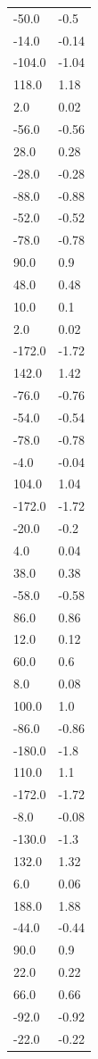 \begin{longtable}{ll}
-50.0 & -0.5 \\
-14.0 & -0.14 \\
-104.0 & -1.04 \\
118.0 & 1.18 \\
2.0 & 0.02 \\
-56.0 & -0.56 \\
28.0 & 0.28 \\
-28.0 & -0.28 \\
-88.0 & -0.88 \\
-52.0 & -0.52 \\
-78.0 & -0.78 \\
90.0 & 0.9 \\
48.0 & 0.48 \\
10.0 & 0.1 \\
2.0 & 0.02 \\
-172.0 & -1.72 \\
142.0 & 1.42 \\
-76.0 & -0.76 \\
-54.0 & -0.54 \\
-78.0 & -0.78 \\
-4.0 & -0.04 \\
104.0 & 1.04 \\
-172.0 & -1.72 \\
-20.0 & -0.2 \\
4.0 & 0.04 \\
38.0 & 0.38 \\
-58.0 & -0.58 \\
86.0 & 0.86 \\
12.0 & 0.12 \\
60.0 & 0.6 \\
8.0 & 0.08 \\
100.0 & 1.0 \\
-86.0 & -0.86 \\
-180.0 & -1.8 \\
110.0 & 1.1 \\
-172.0 & -1.72 \\
-8.0 & -0.08 \\
-130.0 & -1.3 \\
132.0 & 1.32 \\
6.0 & 0.06 \\
188.0 & 1.88 \\
-44.0 & -0.44 \\
90.0 & 0.9 \\
22.0 & 0.22 \\
66.0 & 0.66 \\
-92.0 & -0.92 \\
-22.0 & -0.22 \\

\end{longtable}
